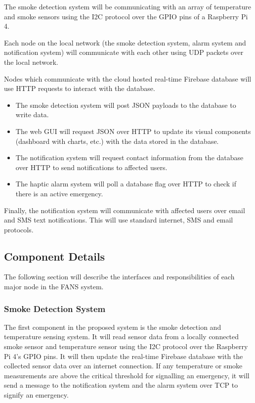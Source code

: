 The smoke detection system will be communicating with an array of temperature and smoke sensors using the I2C protocol
over the GPIO pins of a Raspberry Pi 4.

Each node on the local network (the smoke detection system, alarm system and notification system) will communicate with
each other using UDP packets over the local network.

Nodes which communicate with the cloud hosted real-time Firebase database will use HTTP requests to interact with the
database.

\begin{itemize}
    \item The smoke detection system will post JSON payloads to the database to write data.
    \item The web GUI will request JSON over HTTP to update its visual components (dashboard with charts, etc.) with the data
          stored in the database.
    \item The notification system will request contact information from the database over HTTP to send notifications to affected
          users.
    \item The haptic alarm system will poll a database flag over HTTP to check if there is an active emergency.
\end{itemize}

Finally, the notification system will communicate with affected users over email and SMS text notifications. This will
use standard internet, SMS and email protocols.

\subsection{Component Details}

The following section will describe the interfaces and responsibilities of each major node in the FANS system.

\subsubsection{Smoke Detection System}

The first component in the proposed system is the smoke detection and temperature sensing system. It will read sensor
data from a locally connected smoke sensor and temperature sensor using the I2C protocol over the Raspberry Pi 4's GPIO
pins. It will then update the real-time Firebase database with the collected sensor data over an internet connection.
If any temperature or smoke measurements are above the critical threshold for signalling an emergency, it will send a
message to the notification system and the alarm system over TCP to signify an emergency.

